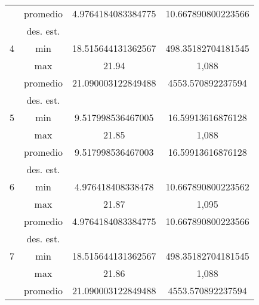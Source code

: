 \documentclass{report}
\begin{document}
\begin{table}[ht]
\begin{tabular}{|c|c|c|c|}
                              & promedio                    &      4.9764184083384775      &    10.667890800223566    \\ \cline{2-4} 
                              & des. est.                   &            &        \\ \hline
        4                     & min                         &      18.515644131362567      &    498.35182704181545    \\ \cline{2-4} 
                              & max                         &     21.94       &   1,088     \\ \cline{2-4} 
                              & promedio                    &     21.090003122849488       &   4553.570892237594     \\ \cline{2-4} 
                              & des. est.                   &            &        \\ \hline
        5                     & min                         &    9.517998536467005        &   16.59913616876128     \\ \cline{2-4} 
                              & max                         &        21.85    &    1,088    \\ \cline{2-4} 
                              & promedio                    &      9.517998536467003      &     16.59913616876128   \\ \cline{2-4} 
                              & des. est.                   &            &        \\ \hline
        6                     & min                         &    4.976418408338478        &    10.667890800223562    \\ \cline{2-4} 
                              & max                         &        21.87    &     1,095   \\ \cline{2-4} 
                              & promedio                    &     4.9764184083384775       &   10.667890800223566     \\ \cline{2-4} 
                              & des. est.                   &            &        \\ \hline
        7                     & min                         &    18.515644131362567        &   498.35182704181545     \\ \cline{2-4} 
                              & max                         &        21.86    &     1,088   \\ \cline{2-4} 
                              & promedio                    &      21.090003122849488      &   4553.570892237594     \\ \cline{2-4} 

\end{tabular}
\end{table}
\end{document}
